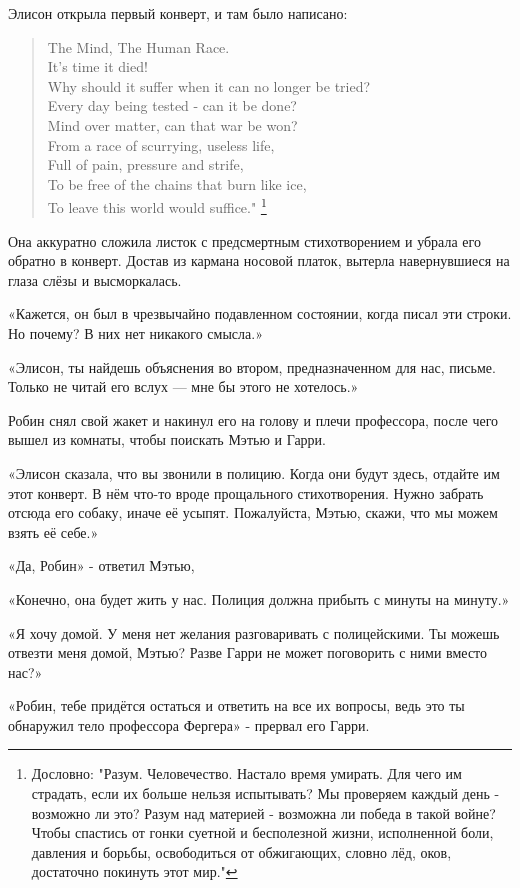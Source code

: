 \documentclass[a5paper, 9pt,
final, openany, twoside=true]{memoir}
\begin{document}
Элисон открыла первый конверт, и там было написано:
\begin{quote}
The Mind, The Human Race.\\
It's time it died!\\
Why should it suffer when it can no longer be tried?\\
Every day being tested - can it be done?\\
Mind over matter, can that war be won?\\
From a race of scurrying, useless life,\\
Full of pain, pressure and strife,\\
To be free of the chains that burn like ice,\\
To leave this world would suffice." \footnote[1]{Дословно: "Разум. Человечество. Настало время умирать. Для чего им страдать, если их больше нельзя испытывать? Мы проверяем каждый день - возможно ли это? Разум над материей - возможна ли победа в такой войне? Чтобы спастись от гонки суетной и бесполезной жизни, исполненной боли, давления и борьбы, освободиться от обжигающих, словно лёд, оков, достаточно покинуть этот мир."}
\end{quote}
Она аккуратно сложила листок с предсмертным стихотворением и убрала его обратно в конверт. Достав из кармана носовой платок, вытерла навернувшиеся на глаза слёзы и высморкалась.

«Кажется, он был в чрезвычайно подавленном состоянии, когда писал эти строки. Но почему? В них нет никакого смысла.»

«Элисон, ты найдешь объяснения во втором, предназначенном для нас, письме. Только не читай его вслух — мне бы этого не хотелось.»

Робин снял свой жакет и накинул его на голову и плечи профессора, после чего вышел из комнаты, чтобы поискать Мэтью и Гарри.

«Элисон сказала, что вы звонили в полицию. Когда они будут здесь, отдайте им этот конверт. В нём что-то вроде прощального стихотворения. Нужно забрать отсюда его собаку, иначе её усыпят. Пожалуйста, Мэтью, скажи, что мы можем взять её себе.»

«Да, Робин» - ответил Мэтью,

«Конечно, она будет жить у нас. Полиция должна прибыть с минуты на минуту.»

«Я хочу домой. У меня нет желания разговаривать с полицейскими. Ты можешь отвезти меня домой, Мэтью? Разве Гарри не может поговорить с ними вместо нас?»

«Робин, тебе придётся остаться и ответить на все их вопросы, ведь это ты обнаружил тело профессора Фергера» - прервал его Гарри.
\end{document}
